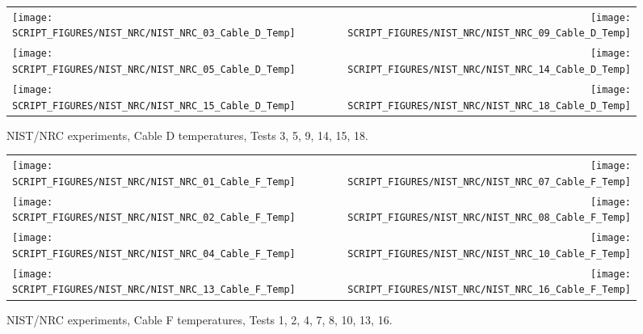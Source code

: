 \begin{figure}[p]
\begin{tabular*}{\textwidth}{l@{\extracolsep{\fill}}r}
\texttt{[image: SCRIPT\_FIGURES/NIST\_NRC/NIST\_NRC\_03\_Cable\_D\_Temp]} &
\texttt{[image: SCRIPT\_FIGURES/NIST\_NRC/NIST\_NRC\_09\_Cable\_D\_Temp]} \\
\texttt{[image: SCRIPT\_FIGURES/NIST\_NRC/NIST\_NRC\_05\_Cable\_D\_Temp]} &
\texttt{[image: SCRIPT\_FIGURES/NIST\_NRC/NIST\_NRC\_14\_Cable\_D\_Temp]} \\
\texttt{[image: SCRIPT\_FIGURES/NIST\_NRC/NIST\_NRC\_15\_Cable\_D\_Temp]} &
\texttt{[image: SCRIPT\_FIGURES/NIST\_NRC/NIST\_NRC\_18\_Cable\_D\_Temp]}
\end{tabular*}
\caption[NIST/NRC experiments, Cable D temperatures, Tests 3, 5, 9, 14, 15, 18]{NIST/NRC experiments, Cable D temperatures, Tests 3, 5, 9, 14, 15, 18.}
\label{NIST_NRC_Cable_D_Open}
\end{figure}

\begin{figure}[p]
\begin{tabular*}{\textwidth}{l@{\extracolsep{\fill}}r}
\texttt{[image: SCRIPT\_FIGURES/NIST\_NRC/NIST\_NRC\_01\_Cable\_F\_Temp]} &
\texttt{[image: SCRIPT\_FIGURES/NIST\_NRC/NIST\_NRC\_07\_Cable\_F\_Temp]} \\
\texttt{[image: SCRIPT\_FIGURES/NIST\_NRC/NIST\_NRC\_02\_Cable\_F\_Temp]} &
\texttt{[image: SCRIPT\_FIGURES/NIST\_NRC/NIST\_NRC\_08\_Cable\_F\_Temp]} \\
\texttt{[image: SCRIPT\_FIGURES/NIST\_NRC/NIST\_NRC\_04\_Cable\_F\_Temp]} &
\texttt{[image: SCRIPT\_FIGURES/NIST\_NRC/NIST\_NRC\_10\_Cable\_F\_Temp]} \\
\texttt{[image: SCRIPT\_FIGURES/NIST\_NRC/NIST\_NRC\_13\_Cable\_F\_Temp]} &
\texttt{[image: SCRIPT\_FIGURES/NIST\_NRC/NIST\_NRC\_16\_Cable\_F\_Temp]}
\end{tabular*}
\caption[NIST/NRC experiments, Cable F temperatures, Tests 1, 2, 4, 7, 8, 10, 13, 16]{NIST/NRC experiments, Cable F temperatures, Tests 1, 2, 4, 7, 8, 10, 13, 16.}
\label{NIST_NRC_Cable_F_Closed}
\end{figure}

